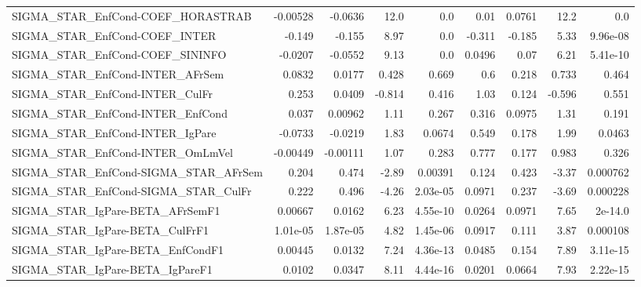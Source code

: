 \begin{tabular}{lrrrrrrrr}
SIGMA\_STAR\_EnfCond-COEF\_HORASTRAB     &    -0.00528 &      -0.0636 &    12.0 &      0.0 &       0.01 &      0.0761 &         12.2 &           0.0 \\
SIGMA\_STAR\_EnfCond-COEF\_INTER         &      -0.149 &       -0.155 &    8.97 &      0.0 &     -0.311 &      -0.185 &         5.33 &      9.96e-08 \\
SIGMA\_STAR\_EnfCond-COEF\_SININFO       &     -0.0207 &      -0.0552 &    9.13 &      0.0 &     0.0496 &        0.07 &         6.21 &      5.41e-10 \\
SIGMA\_STAR\_EnfCond-INTER\_AFrSem       &      0.0832 &       0.0177 &   0.428 &    0.669 &        0.6 &       0.218 &        0.733 &         0.464 \\
SIGMA\_STAR\_EnfCond-INTER\_CulFr        &       0.253 &       0.0409 &  -0.814 &    0.416 &       1.03 &       0.124 &       -0.596 &         0.551 \\
SIGMA\_STAR\_EnfCond-INTER\_EnfCond      &       0.037 &      0.00962 &    1.11 &    0.267 &      0.316 &      0.0975 &         1.31 &         0.191 \\
SIGMA\_STAR\_EnfCond-INTER\_IgPare       &     -0.0733 &      -0.0219 &    1.83 &   0.0674 &      0.549 &       0.178 &         1.99 &        0.0463 \\
SIGMA\_STAR\_EnfCond-INTER\_OmLmVel      &    -0.00449 &     -0.00111 &    1.07 &    0.283 &      0.777 &       0.177 &        0.983 &         0.326 \\
SIGMA\_STAR\_EnfCond-SIGMA\_STAR\_AFrSem  &       0.204 &        0.474 &   -2.89 &  0.00391 &      0.124 &       0.423 &        -3.37 &      0.000762 \\
SIGMA\_STAR\_EnfCond-SIGMA\_STAR\_CulFr   &       0.222 &        0.496 &   -4.26 & 2.03e-05 &     0.0971 &       0.237 &        -3.69 &      0.000228 \\
SIGMA\_STAR\_IgPare-BETA\_AFrSemF1       &     0.00667 &       0.0162 &    6.23 & 4.55e-10 &     0.0264 &      0.0971 &         7.65 &       2e-14.0 \\
SIGMA\_STAR\_IgPare-BETA\_CulFrF1        &    1.01e-05 &     1.87e-05 &    4.82 & 1.45e-06 &     0.0917 &       0.111 &         3.87 &      0.000108 \\
SIGMA\_STAR\_IgPare-BETA\_EnfCondF1      &     0.00445 &       0.0132 &    7.24 & 4.36e-13 &     0.0485 &       0.154 &         7.89 &      3.11e-15 \\
SIGMA\_STAR\_IgPare-BETA\_IgPareF1       &      0.0102 &       0.0347 &    8.11 & 4.44e-16 &     0.0201 &      0.0664 &         7.93 &      2.22e-15 \\

\end{tabular}
